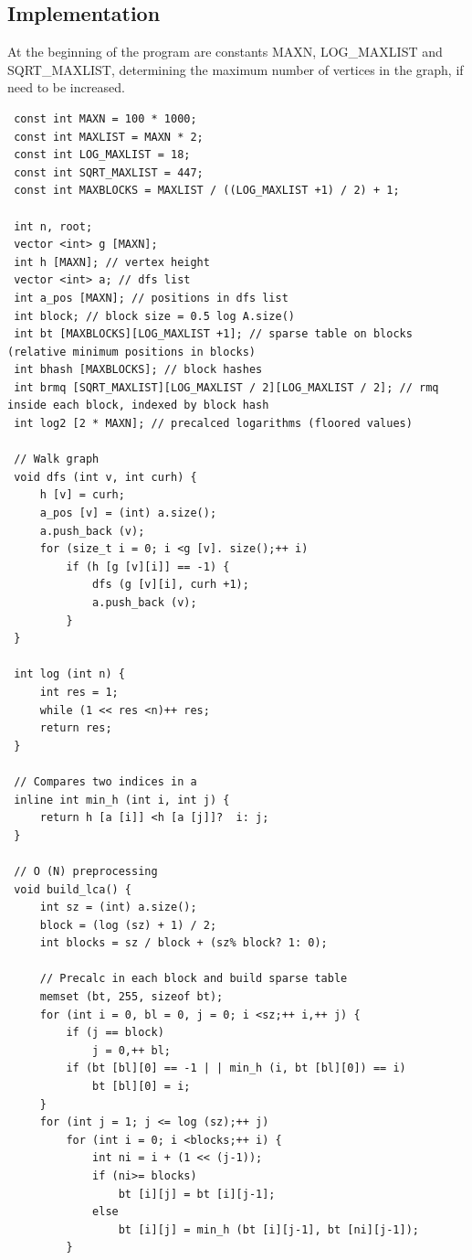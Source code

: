 \subsection{ Implementation }
At the beginning of the program are constants MAXN, LOG\_MAXLIST and SQRT\_MAXLIST, determining the maximum number of vertices in the graph, if need to be increased.

\begin{verbatim}
 const int MAXN = 100 * 1000;
 const int MAXLIST = MAXN * 2;
 const int LOG_MAXLIST = 18;
 const int SQRT_MAXLIST = 447;
 const int MAXBLOCKS = MAXLIST / ((LOG_MAXLIST +1) / 2) + 1;

 int n, root;
 vector <int> g [MAXN];
 int h [MAXN]; // vertex height
 vector <int> a; // dfs list
 int a_pos [MAXN]; // positions in dfs list
 int block; // block size = 0.5 log A.size()
 int bt [MAXBLOCKS][LOG_MAXLIST +1]; // sparse table on blocks (relative minimum positions in blocks)
 int bhash [MAXBLOCKS]; // block hashes
 int brmq [SQRT_MAXLIST][LOG_MAXLIST / 2][LOG_MAXLIST / 2]; // rmq inside each block, indexed by block hash
 int log2 [2 * MAXN]; // precalced logarithms (floored values)

 // Walk graph
 void dfs (int v, int curh) {
     h [v] = curh;
     a_pos [v] = (int) a.size();
     a.push_back (v);
     for (size_t i = 0; i <g [v]. size();++ i)
         if (h [g [v][i]] == -1) {
             dfs (g [v][i], curh +1);
             a.push_back (v);
         }
 }

 int log (int n) {
     int res = 1;
     while (1 << res <n)++ res;
     return res;
 }

 // Compares two indices in a
 inline int min_h (int i, int j) {
     return h [a [i]] <h [a [j]]?  i: j;
 }

 // O (N) preprocessing
 void build_lca() {
     int sz = (int) a.size();
     block = (log (sz) + 1) / 2;
     int blocks = sz / block + (sz% block? 1: 0);

     // Precalc in each block and build sparse table
     memset (bt, 255, sizeof bt);
     for (int i = 0, bl = 0, j = 0; i <sz;++ i,++ j) {
         if (j == block)
             j = 0,++ bl;
         if (bt [bl][0] == -1 | | min_h (i, bt [bl][0]) == i)
             bt [bl][0] = i;
     }
     for (int j = 1; j <= log (sz);++ j)
         for (int i = 0; i <blocks;++ i) {
             int ni = i + (1 << (j-1));
             if (ni>= blocks)
                 bt [i][j] = bt [i][j-1];
             else
                 bt [i][j] = min_h (bt [i][j-1], bt [ni][j-1]);
         }


\end{verbatim}
